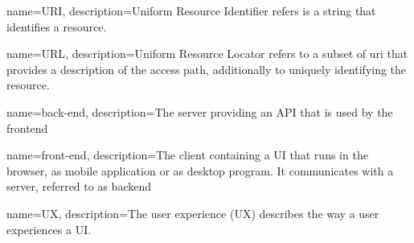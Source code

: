 {
    name={URI},
    description={Uniform Resource Identifier refers is a string that identifies a resource.}
}

{
    name={URL},
    description={Uniform Resource Locator refers to a subset of \gls{uri} that provides a description of the access path, additionally to uniquely identifying the resource.}
}

{
    name={back-end},
    description={The server providing an API that is used by the \gls{frontend}}
}

{
    name={front-end},
    description={The client containing a UI that runs in the browser, as mobile application or as desktop program. It communicates with a server, referred to as \gls{backend}}
}

{
    name={UX},
    description={The user experience (UX) describes the way a user experiences a UI.}
}
